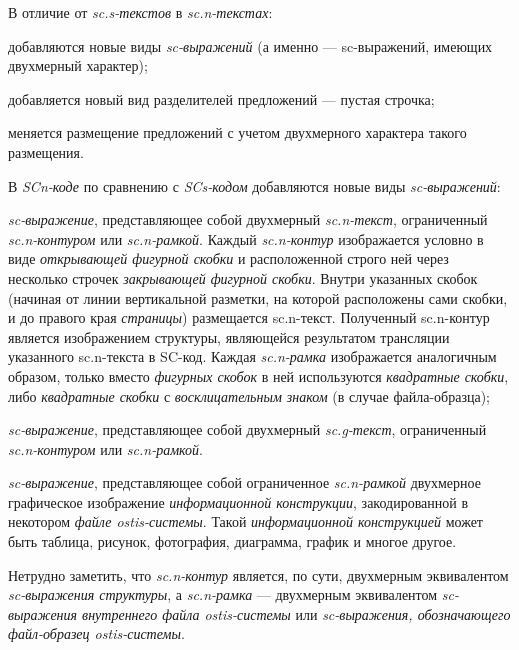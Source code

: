 В отличие от \textit{sc.s-текстов} в \textit{sc.n-текстах}:
\begin{textitemize}
	\item добавляются новые виды \textit{sc-выражений} (а именно --- sc-выражений, имеющих двухмерный характер);
	\item добавляется новый вид разделителей предложений --- пустая строчка;
	\item меняется размещение предложений с учетом двухмерного характера такого размещения.
\end{textitemize}

В \textit{SCn-коде} по сравнению с \textit{SCs-кодом} добавляются новые виды \textit{sc-выражений}:
\begin{textitemize}
	\item \textit{sc-выражение}, представляющее собой двухмерный \textit{\mbox{sc.n-текст}}, ограниченный \textit{sc.n-контуром} или \textit{sc.n-рамкой}. Каждый \textit{sc.n-контур} изображается условно в виде \textit{открывающей фигурной скобки} и расположенной строго  ней через несколько строчек \textit{закрывающей фигурной скобки}. Внутри указанных скобок (начиная от линии вертикальной разметки, на которой расположены сами скобки, и до правого края \textit{страницы}) размещается sc.n-текст. Полученный sc.n-контур является изображением структуры, являющейся результатом трансляции указанного sc.n-текста в SC-код. Каждая \textit{sc.n-рамка} изображается аналогичным образом, только вместо \textit{фигурных скобок} в ней используются \textit{квадратные скобки}, либо \textit{квадратные скобки} с \textit{восклицательным знаком} (в случае файла-образца);
	\item \textit{sc-выражение}, представляющее собой двухмерный \textit{sc.g-текст}, ограниченный \textit{\mbox{sc.n-контуром}} или \textit{\mbox{sc.n-рамкой}}.
	\item \textit{sc-выражение}, представляющее собой ограниченное \textit{sc.n-рамкой} двухмерное графическое изображение \textit{информационной конструкции}, закодированной в некотором \textit{файле ostis-системы}. Такой \textit{информационной конструкцией} может быть таблица, рисунок, фотография, диаграмма, график и многое другое.
\end{textitemize}

Нетрудно заметить, что \textit{sc.n-контур} является, по сути, двухмерным эквивалентом \textit{sc-выражения структуры}, а \textit{sc.n-рамка} --- двухмерным эквивалентом \textit{sc-выражения внутреннего файла \mbox{ostis-системы}} или \textit{sc-выражения, обозначающего файл-образец ostis-системы}.

